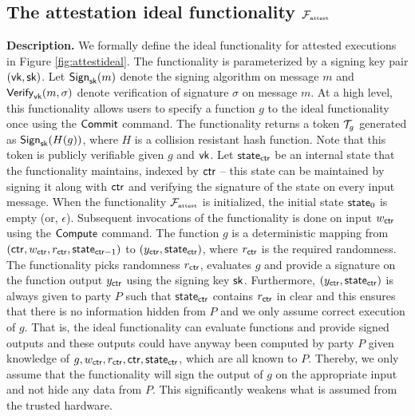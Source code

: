 \subsection{The attestation ideal functionality $\mathcal{F}_{\textrm{\tiny{attest}}}$}
\label{subsec:sgxideal}
\noindent\textbf{Description.} We formally define the ideal functionality for attested executions 
in Figure \ref{fig:attestideal}.
The functionality is parameterized by a signing key pair $(\mathsf{vk},\mathsf{sk})$. Let 
 $\mathsf{Sign}_{\mathsf{sk}}(m)$ denote the signing algorithm on message $m$ and $\mathsf{Verify}_{\mathsf{vk}}(m,\sigma)$ denote verification of signature $\sigma$ on message $m$. 
At a high level, this functionality allows users to specify a function $g$ to the ideal functionality once using the $\mathsf{Commit}$ command. 
The functionality returns a token $\mathcal{T}_g$ generated as $\mathsf{Sign}_{\mathsf{sk}}(H(g))$, where $H$ is a collision resistant hash function. 
Note that this token is publicly verifiable given $g$ and $\mathsf{vk}$.
Let $\mathsf{state}_{\mathsf{ctr}}$ be an internal state that the functionality maintains,
indexed by $\mathsf{ctr}$ -- this state can be maintained by signing it along
with $\mathsf{ctr}$ and verifying the signature of the state on every input
message.
When the functionality $\mathcal{F}_{\textrm{\tiny{attest}}}$ is initialized, the initial state $\mathsf{state}_0$ is empty (or, $\epsilon$). %
Subsequent invocations of the functionality is done on input $w_{\mathsf{ctr}}$
using the $\mathsf{Compute}$ command. 
The function $g$ is a deterministic mapping from $(\mathsf{ctr},w_{\mathsf{ctr}},r_{\mathsf{ctr}},\mathsf{state}_{\mathsf{ctr}-1})$ to
$(y_{\mathsf{ctr}},\mathsf{state}_{\mathsf{ctr}})$, where $r_{\mathsf{ctr}}$ is the required randomness.
The functionality picks randomness $r_{\mathsf{ctr}}$, evaluates $g$ and provide a signature on the function output $y_{\mathsf{ctr}}$ using the signing key $\mathsf{sk}$.  
Furthermore, $(y_{\mathsf{ctr}},\mathsf{state}_{\mathsf{ctr}})$ is always given to party $P$ such that $\mathsf{state}_{\mathsf{ctr}}$ contains $r_{\mathsf{ctr}}$ in clear and 
%
this ensures that there is no information hidden from $P$ and we only assume correct execution of $g$.
That is, the ideal functionality can evaluate functions and provide signed outputs and these outputs could have anyway been computed by party $P$ given
knowledge of $g, w_{\mathsf{ctr}}, r_{\mathsf{ctr}}, \mathsf{ctr}, \mathsf{state}_{\mathsf{ctr}}$, which are all known to $P$. 
Thereby, we only assume that the functionality will sign the output of $g$ on the appropriate input and not hide any  data from $P$. This significantly weakens what is assumed from the trusted hardware.


